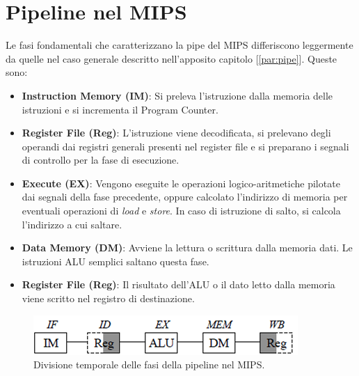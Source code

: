 \section{Pipeline nel MIPS}
Le fasi fondamentali che caratterizzano la pipe del MIPS differiscono leggermente da quelle nel caso generale descritto nell'apposito capitolo [\ref{par:pipe}]. Queste sono:
\begin{itemize}
    \item \textbf{Instruction Memory (IM)}: Si preleva l'istruzione dalla memoria delle istruzioni e si incrementa il Program Counter.
    \item \textbf{Register File (Reg)}: L'istruzione viene decodificata, si prelevano degli operandi dai registri generali presenti nel register file e si preparano i segnali di controllo per la fase di esecuzione.
    \item \textbf{Execute (EX)}: Vengono eseguite le operazioni logico-aritmetiche pilotate dai segnali della fase precedente, oppure calcolato l'indirizzo di memoria per eventuali operazioni di \textit{load} e \textit{store}. In caso di istruzione di salto, si calcola l'indirizzo a cui saltare.
    \item \textbf{Data Memory (DM)}: Avviene la lettura o scrittura dalla memoria dati. Le istruzioni ALU semplici saltano questa fase.
    \item \textbf{Register File (Reg)}: Il risultato dell’ALU o il dato letto dalla memoria viene scritto nel registro di destinazione.
\end{itemize}
\begin{figure}[!h]
    \centering
    \includegraphics[width=0.5\linewidth]{img/MIPS_clock_split.png}
    \caption{Divisione temporale delle fasi della pipeline nel MIPS.}
    \label{fig:mips-pipe}
\end{figure}

